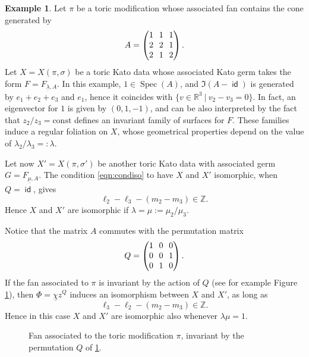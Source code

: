\documentclass[JEP,XML,SOM,Unicode,NoFloatCountersInSection]{cedram}
\theoremstyle{definition}
\newtheorem{example}[theorem]{Example}
\let\la\lambda
\let\un\underline
\newcommand{\RR}{\mathbb{R}}
\newcommand{\ZZ}{\mathbb{Z}}
\DeclareMathOperator{\id}{\mathsf{id}}
\DeclareMathOperator{\Spec}{Spec}
\begin{document}
\begin{example}\label{ex:nontrivialiso3d}
Let $\pi$ be a toric modification whose associated fan contains the cone generated by
\[\arraycolsep3.5pt
A=\begin{pmatrix}
1&1&1\\
2&2&1\\
2&1&2
\end{pmatrix}.
\]
Let $X=X(\pi, \sigma)$ be a toric Kato data whose associated Kato germ takes the form $F=F_{\un\la,A}$.
In this example, $1 \in \Spec(A)$, and $\Im(A-\id)$ is generated by $e_1+e_2+e_3$ and $e_1$, hence it coincides with $\{v \in \RR^3\ |\ v_2-v_3=0\}$.
In fact, an eigenvector for $1$ is given by $(0,1,-1)$, and can be also interpreted by the fact that $z_2/z_3=\text{const}$ defines an invariant family of surfaces for $F$.
These families induce a regular foliation on $X$, whose geometrical properties depend on the value of $\lambda_2/\lambda_3=:\lambda$.

Let now $X'=X(\pi,\sigma')$ be another toric Kato data with associated germ $G=F_{\un\mu,A}$.
The condition \eqref{eqn:condiso} to have $X$ and $X'$ isomorphic, when $Q=\id$, gives
\[
\ell_2-\ell_3-(m_2-m_3) \in \ZZ.
\]
Hence $X$ and $X'$ are isomorphic if $\lambda=\mu:=\mu_2/\mu_3$.

Notice that the matrix $A$ commutes with the permutation matrix
\[\arraycolsep3.5pt
Q=\begin{pmatrix}
1&0&0\\
0&0&1\\
0&1&0
\end{pmatrix}.
\]
If the fan associated to $\pi$ is invariant by the action of $Q$ (see for example Figure \ref{fig:example3}), then $\Phi=\un{\chi} z^Q$ induces an isomorphism between $X$ and $X'$, as long as
\[
\ell_3-\ell_2-(m_2-m_3) \in \ZZ.
\]
Hence in this case $X$ and $X'$ are isomorphic also whenever $\lambda\mu=1$.

\begin{tiny}
\begin{figure}
\begin{center}
\begin{minipage}[htbp]{0.5\columnwidth}
\def\svgwidth{0.95\columnwidth}

\end{minipage}
\end{center}
\caption{Fan associated to the toric modification $\pi$, invariant by the permutation $Q$ of \ref{ex:nontrivialiso3d}.}
\label{fig:example3}
\end{figure}
\end{tiny}
\end{example}
\end{document}
